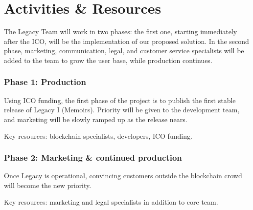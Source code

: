 \section{Activities \& Resources} %
\label{sec:activities_resources}
The Legacy Team will work in two phases: the first one, starting immediately after the ICO, will be the implementation of our proposed solution. In the second phase, marketing, communication, legal, and customer service specialists will be added to the team to grow the user base, while production continues.

\subsubsection*{Phase 1: Production} %
\label{ssub:phase_1_production}
Using ICO funding, the first phase of the project is to publish the first stable release of Legacy I (Memoirs). Priority will be given to the development team, and marketing will be slowly ramped up as the release nears.

Key resources: blockchain specialists, developers, ICO funding.


\subsubsection{Phase 2: Marketing \& continued production} %
\label{ssub:phase_2_marketing_continued_production}
Once Legacy is operational, convincing customers outside the blockchain crowd will become the new priority.

Key resources: marketing and legal specialists in addition to core team.



